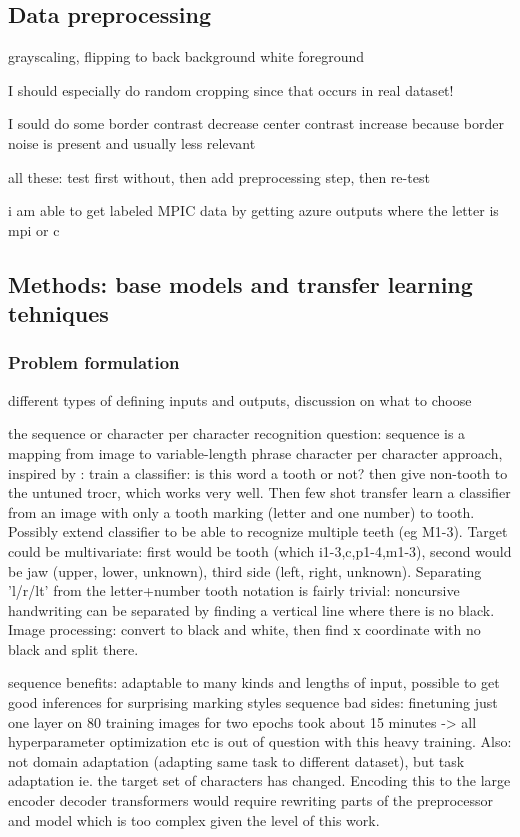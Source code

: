 \documentclass{article}
\begin{document}
\subsection{Data preprocessing}

grayscaling, flipping to back background white foreground

I should especially do random cropping since that occurs in real dataset!

I sould do some border contrast decrease center contrast increase because border noise is present and usually less relevant 

all these: test first without, then add preprocessing step, then re-test

i am able to get labeled MPIC data by getting azure outputs where the letter is mpi or c

\subsection{Methods: base models and transfer learning tehniques}

\subsubsection{Problem formulation}

different types of defining inputs and outputs, discussion on what to choose

the sequence or character per character recognition question:
sequence is a mapping from image to variable-length phrase
character per character approach, inspired by \cite{tibetan_ocr}:
train a classifier: is this word a tooth or not? then give non-tooth to the untuned
trocr, which works very well. Then few shot transfer learn a classifier from an image
with only a tooth marking (letter and one number) to tooth. Possibly extend classifier to 
be able to recognize multiple teeth (eg M1-3). Target could be multivariate: first would
be tooth (which i1-3,c,p1-4,m1-3), second would be jaw (upper, lower, unknown), third side 
(left, right, unknown). Separating 'l/r/lt' from the letter+number tooth notation is 
fairly trivial: noncursive handwriting can be separated by finding a vertical line where there 
is no black. Image processing: convert to black and white, then find x coordinate with no black 
and split there.

sequence benefits: adaptable to many kinds and lengths of input, possible to get good inferences 
for surprising marking styles 
sequence bad sides: finetuning just one layer on 80 training images for two epochs took about 15 minutes
-> all hyperparameter optimization etc is out of question with this heavy training.
Also: not domain adaptation (adapting same task to different dataset), but task adaptation ie. 
the target set of characters has changed. Encoding this to the large encoder decoder transformers would 
require rewriting parts of the preprocessor and model which is too complex given the level of this work.
\end{document}
